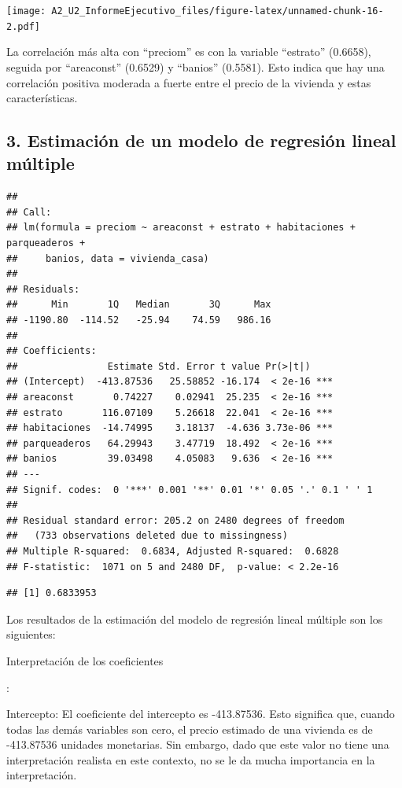 \documentclass[
]{article}
\begin{document}
\texttt{[image: A2\_U2\_InformeEjecutivo\_files/figure-latex/unnamed-chunk-16-2.pdf]}

La correlación más alta con ``preciom'' es con la variable ``estrato''
(0.6658), seguida por ``areaconst'' (0.6529) y ``banios'' (0.5581). Esto
indica que hay una correlación positiva moderada a fuerte entre el
precio de la vivienda y estas características.

\subsection{3. Estimación de un modelo de regresión lineal
múltiple}\label{estimaciuxf3n-de-un-modelo-de-regresiuxf3n-lineal-muxfaltiple}

\begin{verbatim}
## 
## Call:
## lm(formula = preciom ~ areaconst + estrato + habitaciones + parqueaderos + 
##     banios, data = vivienda_casa)
## 
## Residuals:
##      Min       1Q   Median       3Q      Max 
## -1190.80  -114.52   -25.94    74.59   986.16 
## 
## Coefficients:
##                Estimate Std. Error t value Pr(>|t|)    
## (Intercept)  -413.87536   25.58852 -16.174  < 2e-16 ***
## areaconst       0.74227    0.02941  25.235  < 2e-16 ***
## estrato       116.07109    5.26618  22.041  < 2e-16 ***
## habitaciones  -14.74995    3.18137  -4.636 3.73e-06 ***
## parqueaderos   64.29943    3.47719  18.492  < 2e-16 ***
## banios         39.03498    4.05083   9.636  < 2e-16 ***
## ---
## Signif. codes:  0 '***' 0.001 '**' 0.01 '*' 0.05 '.' 0.1 ' ' 1
## 
## Residual standard error: 205.2 on 2480 degrees of freedom
##   (733 observations deleted due to missingness)
## Multiple R-squared:  0.6834, Adjusted R-squared:  0.6828 
## F-statistic:  1071 on 5 and 2480 DF,  p-value: < 2.2e-16
\end{verbatim}

\begin{verbatim}
## [1] 0.6833953
\end{verbatim}

Los resultados de la estimación del modelo de regresión lineal múltiple
son los siguientes:

Interpretación de los coeficientes

:

Intercepto: El coeficiente del intercepto es -413.87536. Esto significa
que, cuando todas las demás variables son cero, el precio estimado de
una vivienda es de -413.87536 unidades monetarias. Sin embargo, dado que
este valor no tiene una interpretación realista en este contexto, no se
le da mucha importancia en la interpretación.
\end{document}
